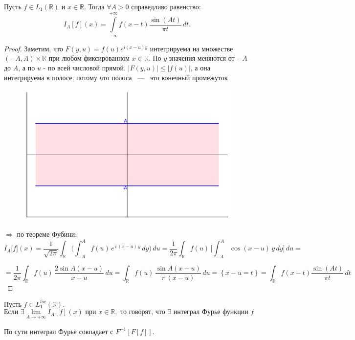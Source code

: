 \begin{lemma}[Ключевая]\label{lem:key}
Пусть $f \in L_1(\mathbb{R})$ и $x \in \mathbb{R}$. Тогда $\forall A > 0$ справедливо равенство:
\[
I_A \left[ f \right](x) = \int\limits_{-\infty}^{+\infty} f(x - t) \frac{\sin(At)}{\pi t} \, dt.
\]
\end{lemma}

\begin{proof}

Заметим, что $F(y, u) = f(u)e^{i(x-u)y}$ интегрируема на множестве $(-A, A) \times \mathbb{R}$ при любом фиксированном $x \in \mathbb{R}$. По $y$ значения меняются от $-A$ до $A$, а по $u$ - по всей числовой прямой. $|F(y, u)| \leq |f(u)|$, а она интегрируема в полосе, потому что полоса ~---~ это конечный промежуток

\begin{figure}[h]
    \centering
    \includegraphics[width=0.8\linewidth]{Pictures/graph1.png}
    \label{fig:graph1}
\end{figure}

$\Rightarrow$ по теореме Фубини:
\[
I_{A}\bigl[f\bigr](x)
= \frac{1}{\sqrt{2\pi}}
\int_{\mathbb{R}}
\Biggl(
\int_{-A}^{A} f(u)\,e^{\,i\,(x - u)\,y}\,dy
\Biggr)\,du
= \frac{1}{2\pi}
\int_{\mathbb{R}}
f(u)\,
\Biggl[
\int_{-A}^{A}
\cos(x - u)\,y\,dy
\Biggr]
\,du =
\]

\[
= \frac{1}{2\pi}
\int_{\mathbb{R}}
f(u)\,
\frac{2 \sin A(x - u)}{x - u}
\,du
=
\int_{\mathbb{R}}
f(u)\,
\frac{\sin A(x - u)}{\pi\,(x - u)}
\,du = \left\{
    x - u = t
\right\} =
\int_{\mathbb{R}}
f(x - t)
\frac{\sin(At)}{\pi t} \, dt
\]

\end{proof}

\begin{definition}
    Пусть $f \in L_1^{loc}(\mathbb{R})$.
\[
\text{Если } \exists \lim_{A \to +\infty} I_A[f](x) \text{ при } x \in \mathbb{R}, \text{ то говорят, что $\exists$ интеграл Фурье функции } f
\]

\begin{center}
    По сути интеграл Фурье совпадает с $F^{-1}[F[f]].$
\end{center}
\end{definition}


